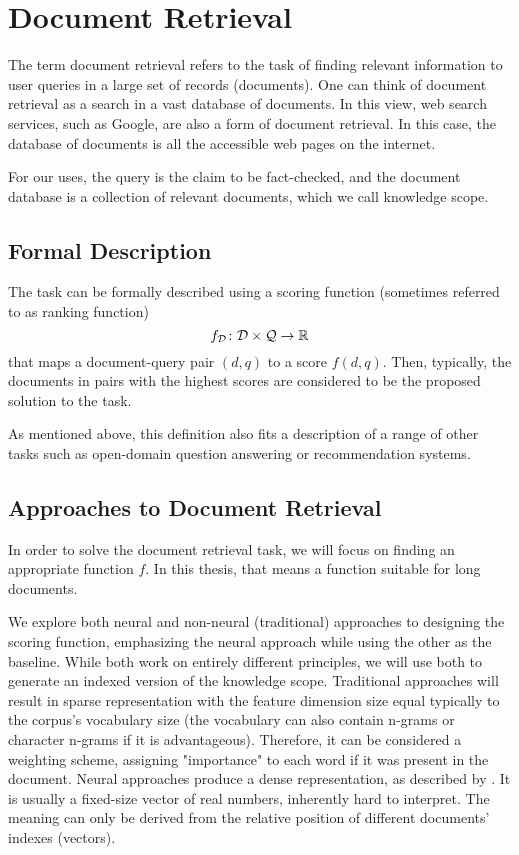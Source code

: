 \chapter{Document Retrieval}
\label{chap:docret}

The term document retrieval refers to the task of finding relevant information to user queries in a large set of records (documents). 
One can think of document retrieval as a search in a vast database of documents. 
In this view, web search services, such as Google, are also a form of document retrieval. 
In this case, the database of documents is all the accessible web pages on the internet.

For our uses, the query is the claim to be fact-checked, and the document database is a collection of relevant documents, which we call knowledge scope. 

\section{Formal Description}
\label{sec:formal_descr_dr}
The task can be formally described \citep{two-tower} using a scoring function (sometimes referred to as ranking function) %
$$f_\mathcal{D}\colon\mathcal{D}\times\mathcal{Q}\rightarrow\mathbb{R}$$
that maps a document-query pair $(d, q)$ to a score $f(d,q)$. 
Then, typically, the documents in pairs with the highest scores are considered to be the proposed solution to the task. 

As mentioned above, this definition also fits a description of a range of other tasks such as open-domain question answering \citep{wiki-retrieval} or recommendation systems.

\section{Approaches to Document Retrieval}
In order to solve the document retrieval task, we will focus on finding an appropriate function $f$.
In this thesis, that means a function suitable for long documents.

We explore both neural and non-neural (traditional) approaches to designing the scoring function, emphasizing the neural approach while using the other as the baseline. 
While both work on entirely different principles, we will use both to generate an indexed version of the knowledge scope.
Traditional approaches will result in sparse representation with the feature dimension size equal typically to the corpus's vocabulary size (the vocabulary can also contain n-grams or character n-grams if it is advantageous).
Therefore, it can be considered a weighting scheme, assigning "importance" to each word if it was present in the document. 
Neural approaches produce a dense representation, as described by \citet{two-tower}.
It is usually a fixed-size vector of real numbers, inherently hard to interpret.
The meaning can only be derived from the relative position of different documents' indexes (vectors).

